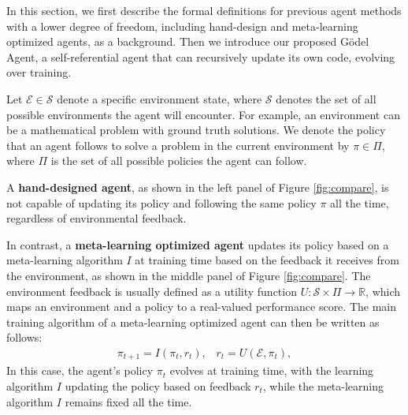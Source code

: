 \documentclass[11pt]{article}
\newcommand{\framework}{Gödel Agent\xspace}
\begin{document}
In this section, we first describe the formal definitions for previous agent methods with a lower degree of freedom, including hand-design and meta-learning optimized agents, as a background. Then we introduce our proposed \framework, a self-referential agent that can recursively update its own code, evolving over training.



Let $\mathcal{E} \in \mathcal{S}$ denote a specific environment state, where $\mathcal{S}$ denotes the set of all possible environments the agent will encounter. For example, an environment can be a mathematical problem with ground truth solutions.
We denote the policy that an agent follows to solve a problem in the current environment by $\pi \in \Pi$, where $\Pi$ is the set of all possible policies the agent can follow. 

A \textbf{hand-designed agent}, as shown in the left panel of Figure \ref{fig:compare}, is not capable of updating its policy and following the same policy $\pi$ all the time, regardless of environmental feedback.

In contrast, a \textbf{meta-learning optimized agent} updates its policy based on a meta-learning algorithm $I$ at training time based on the feedback it receives from the environment, as shown in the middle panel of Figure \ref{fig:compare}. The environment feedback is usually defined as a utility function $U: \mathcal{S} \times \Pi \rightarrow \mathbb{R}$, which maps an environment and a policy to a real-valued performance score. The main training algorithm of a meta-learning optimized agent can then be written as follows:
\begin{align*}
    \pi_{t+1} = I(\pi_t, r_t),\;\;\; r_t = U(\mathcal{E}, \pi_t),
\end{align*}
In this case, the agent's policy $\pi_t$ evolves at training time, with the learning algorithm $I$ updating the policy based on feedback $r_t$, while the meta-learning algorithm $I$ remains fixed all the time.
\end{document}
